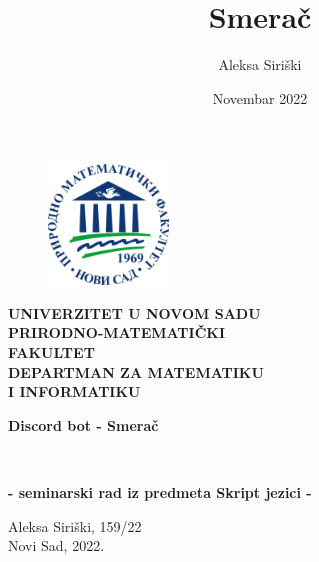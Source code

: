 \documentclass[a4paper,14pt]{article}
\title{Smerač}
\author{Aleksa Siriški}
\date{Novembar 2022}
\begin{document}
\pagestyle{empty}

\begin{center}
    \begin{figure}
        \centering
        \includegraphics[height=3.2cm,width=3.2cm]{pmf}
    \end{figure}

    \textbf{
    UNIVERZITET U NOVOM SADU
    \\
    PRIRODNO-MATEMATIČKI
    \\
    FAKULTET
    \\
    DEPARTMAN ZA MATEMATIKU
    \\
    I INFORMATIKU
    }

\end{center}

\vfill

\begin{center}
	\begin{huge}
		\textbf{Discord bot - Smerač}
		\bigskip 
	\end{huge}
	\\
	\begin{large}
        \textbf{- seminarski rad iz predmeta Skript jezici -}
	\end{large}
\end{center}

\vfill

\begin{center}
    Aleksa Siriški, 159/22
    \\
    Novi Sad, 2022.
\end{center}
\newpage



\newpage
\end{document}
